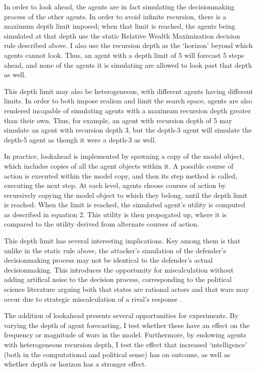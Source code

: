 \documentclass{article}
\begin{document}
In order to look ahead, the agents are in fact simulating the decisionmaking process of the other agents. In order to avoid infinite recursion, there is a maximum depth limit imposed; when that limit is reached, the agents being simulated at that depth use the static Relative Wealth Maximization decision rule described above. I also use the recursion depth as the `horizon' beyond which agents cannot look. Thus, an agent with a depth limit of 5 will forecast 5 steps ahead, and none of the agents it is simulating are allowed to look past that depth as well.

This depth limit may also be heterogeneous, with different agents having different limits. In order to both impose realism and limit the search space, agents are also rendered incapable of simulating agents with a maximum recursion depth greater than their own. Thus, for example, an agent with recursion depth of 5 may simulate an agent with recursion depth 3, but the depth-3 agent will simulate the depth-5 agent as though it were a depth-3 as well.

In practice, lookahead is implemented by spawning a copy of the model object, which includes copies of all the agent objects within it. A possible course of action is executed within the model copy, and then its step method is called, executing the next step. At each level, agents choose courses of action by recursively copying the model object to which they belong, until the depth limit is reached. When the limit is reached, the simulated agent's utility is computed as described in equation 2. This utility is then propogated up, where it is compared to the utility derived from alternate courses of action.

This depth limit has several interesting implications. Key among them is that unlike in the static rule above, the attacker's simulation of the defender's decisionmaking process may not be identical to the defender's actual decisionmaking.  This introduces the opportunity for miscalculation without adding artifical noise to the decision process, corresponding to the political science literature arguing both that states are rational actors and that wars may occur due to strategic miscalculation of a rival's response \citep{fearon_1995}. 

The addition of lookahead presents several opportunities for experiments. By varying the depth of agent forecasting, I test whether these have an effect on the frequency or magnitude of wars in the model. Furthermore, by endowing agents with heterogeneous recursion depth, I test the effect that increased `intelligence' (both in the computational and political sense) has on outcome, as well as whether depth or horizon has a stronger effect. 
\end{document}
